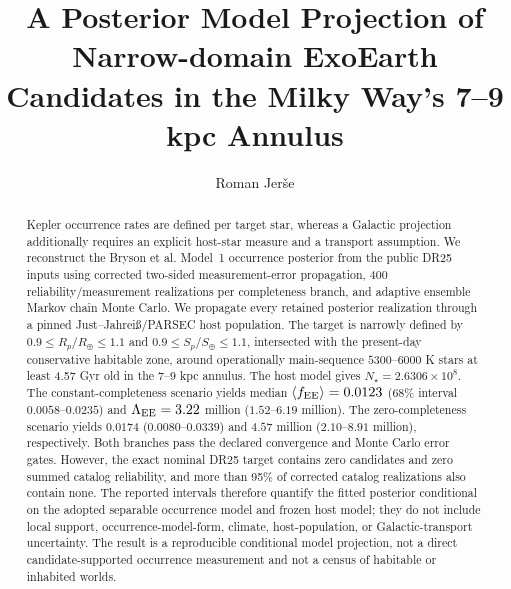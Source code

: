 \documentclass[twocolumn,linenumbers]{aastex702}
\newcommand{\Rearth}{R_{\oplus}}
\newcommand{\Searth}{S_{\oplus}}
\newcommand{\LamEE}{\Lambda_{\rm EE}}
\newcommand{\fEE}{f_{\rm EE}}
\begin{document}

\title{A Posterior Model Projection of Narrow-domain ExoEarth Candidates in the Milky Way's 7--9 kpc Annulus}

\author{Roman Jer\v{s}e}
\email{}

\begin{abstract}
Kepler occurrence rates are defined per target star, whereas a Galactic
projection additionally requires an explicit host-star measure and a transport
assumption. We reconstruct the Bryson et al. Model~1 occurrence posterior from
the public DR25 inputs using corrected two-sided measurement-error propagation,
400 reliability/measurement realizations per completeness branch, and adaptive
ensemble Markov chain Monte Carlo. We propagate every retained posterior
realization through a pinned Just--Jahrei\ss/PARSEC host population. The target
is narrowly defined by $0.9\leq R_p/\Rearth\leq1.1$ and
$0.9\leq S_p/\Searth\leq1.1$, intersected with the present-day conservative
habitable zone, around operationally main-sequence $5300$--$6000$ K stars at
least 4.57 Gyr old in the $7$--$9$ kpc annulus. The host model gives
$N_\star=2.6306\times10^8$. The constant-completeness scenario yields median
$\langle\fEE\rangle=0.0123$ (68\% interval $0.0058$--$0.0235$) and
$\LamEE=3.22$ million ($1.52$--$6.19$ million). The zero-completeness scenario
yields $0.0174$ ($0.0080$--$0.0339$) and $4.57$ million
($2.10$--$8.91$ million), respectively. Both branches pass the declared
convergence and Monte Carlo error gates. However, the exact nominal DR25 target
contains zero candidates and zero summed catalog reliability, and more than
95\% of corrected catalog realizations also contain none. The reported
intervals therefore quantify the fitted posterior conditional on the adopted
separable occurrence model and frozen host model; they do not include local
support, occurrence-model-form, climate, host-population, or Galactic-transport
uncertainty. The result is a reproducible conditional model projection, not a
direct candidate-supported occurrence measurement and not a census of
habitable or inhabited worlds.
\end{abstract}
\end{document}
